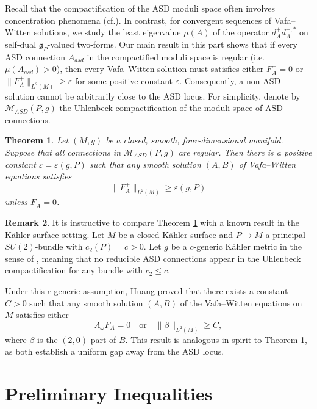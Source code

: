 \documentclass[12pt, twoside]{article}
\newtheorem{theorem}{Theorem}[section]
\theoremstyle{definition}
\newtheorem{remark}[theorem]{Remark}
\numberwithin{equation}{section}
\begin{document}
Recall that the compactification of the ASD moduli space often involves concentration phenomena (cf.\cite{DK90,Fee16,Sed82}). In contrast, for convergent sequences of Vafa–Witten solutions, we study the least eigenvalue $\mu(A)$ of the operator $d^{+}_{A}d_{A}^{+,\ast}$ on self-dual $\mathfrak{g}_{P}$-valued two-forms. Our main result in this part shows that if every ASD connection $A_{asd}$ in the compactified moduli space is regular (i.e. $\mu(A_{asd})>0$),  then every Vafa--Witten solution must satisfies either $F_{A}^{+}=0$ or $\|F_{A}^{+}\|_{L^{2}(M)}\geq\varepsilon$ for some positive constant $\varepsilon$. Consequently, a non-ASD solution cannot be arbitrarily close to the ASD locus. For simplicity, denote by $\overline{\mathcal{M}}_{ASD}(P, g)$ the Uhlenbeck compactification of the moduli space of ASD connections.

\begin{theorem}\label{T8}
	Let $(M,g)$ be a closed, smooth, four-dimensional manifold. Suppose that all connections in $\overline{\mathcal{M}}_{ASD}(P, g)$ are \textit{regular}.
	 Then there is a positive constant $\varepsilon=\varepsilon(g,P)$ such that  any smooth solution $(A,B)$ of Vafa--Witten equations satisfies
	$$\|F_{A}^{+}\|_{L^{2}(M)}\geq \varepsilon(g,P)$$
	unless $F_{A}^{+}=0$. 
\end{theorem}

\begin{remark}
It is instructive to compare Theorem \ref{T8} with a known result in the K\"ahler surface setting. Let $M$ be a closed K\"ahler surface and $P\to M$ a principal $SU(2)$-bundle with $c_2(P)=c>0$. Let $g$ be a $c$-generic K\"ahler metric in the sense of \cite[Definition 1.4]{Hua19}, meaning that no reducible ASD connections appear in the Uhlenbeck compactification for any bundle with $c_2\le c$.

Under this $c$-generic assumption, Huang \cite[Theorem 4.18]{Hua19} proved that there exists a constant $C>0$ such that any smooth solution $(A,B)$ of the Vafa--Witten equations on $M$ satisfies either
\[\Lambda_\omega F_A = 0 \quad\text{or}\quad \|\beta\|_{L^2(M)}\ge C,\]
where $\beta$ is the $(2,0)$-part of $B$. This result is analogous in spirit to Theorem \ref{T8}, as both establish a uniform gap away from the ASD locus. 
\end{remark}


\section{Preliminary Inequalities }\label{sec:prelim}
\end{document}
